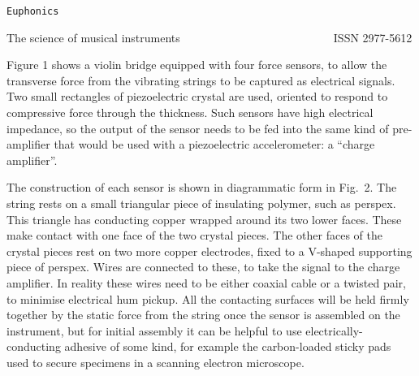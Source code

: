   \tt{}Euphonics\rm{} 

  The science of musical instruments                           ISSN 2977-5612 

  Figure 1 shows a violin bridge equipped with four force sensors, to allow the 
  transverse force from the vibrating strings to be captured as electrical 
  signals. Two small rectangles of piezoelectric crystal are used, oriented to 
  respond to compressive force through the thickness. Such sensors have high 
  electrical impedance, so the output of the sensor needs to be fed into the 
  same kind of pre-amplifier that would be used with a piezoelectric 
  accelerometer: a ``charge amplifier''. 


  The construction of each sensor is shown in diagrammatic form in Fig.\ 2. The 
  string rests on a small triangular piece of insulating polymer, such as 
  perspex. This triangle has conducting copper wrapped around its two lower 
  faces. These make contact with one face of the two crystal pieces. The other 
  faces of the crystal pieces rest on two more copper electrodes, fixed to a 
  V-shaped supporting piece of perspex. Wires are connected to these, to take 
  the signal to the charge amplifier. In reality these wires need to be either 
  coaxial cable or a twisted pair, to minimise electrical hum pickup. All the 
  contacting surfaces will be held firmly together by the static force from the 
  string once the sensor is assembled on the instrument, but for initial 
  assembly it can be helpful to use electrically-conducting adhesive of some 
  kind, for example the carbon-loaded sticky pads used to secure specimens in a 
  scanning electron microscope. 


